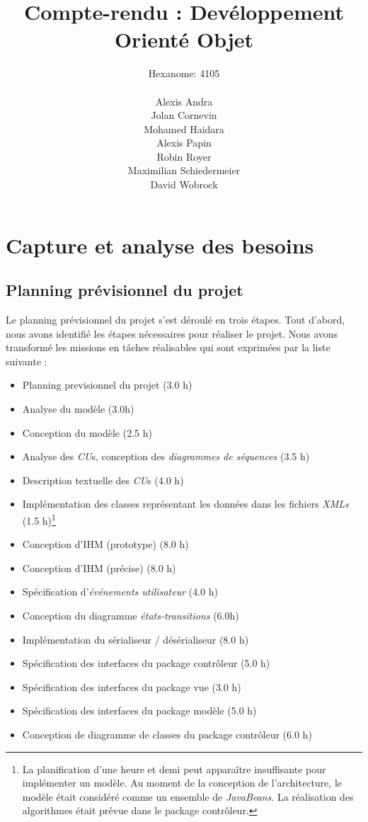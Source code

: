 \documentclass[10pt,a4paper]{book}
\author{Hexanome: 4105\\\\Alexis Andra\\Jolan Cornevin\\Mohamed Haidara\\Alexis Papin\\Robin Royer\\Maximilian Schiedermeier\\David Wobrock}
\title{Compte-rendu : Devéloppement Orienté Objet}
\begin{document}
\maketitle
\tableofcontents 
\chapter{Capture et analyse des besoins}
\section{Planning prévisionnel du projet}
Le planning prévisionnel du projet s'est déroulé en trois étapes. Tout d'abord, nous avons identifié les étapes nécessaires pour réaliser le projet. Nous avons transformé les missions en tâches réalisables qui sont exprimées par la liste suivante :
\begin{itemize}
	\item{Planning previsionnel du projet (3.0 h)}
	\item{Analyse du modèle (3.0h)}
	\item{Conception du modèle (2.5 h)}
	\item{Analyse des \textit{CU}s, conception des \textit{diagrammes de séquences} (3.5 h)}
	\item{Description textuelle des \textit{CU}s (4.0 h)}
	\item{Implémentation des classes représentant les données dans les fichiers \textit{XMLs} (1.5 h)\footnote{La planification d'une heure et demi peut apparaître insuffisante pour implémenter un modèle. Au moment de la conception de l'architecture, le modèle était considéré comme un ensemble de \textit{JavaBeans}. La réalisation des algorithmes était prévue dans le package contrôleur.}}
	\item{Conception d'IHM (prototype) (8.0 h)}
	\item{Conception d'IHM (précise) (8.0 h)}
	\item{Spécification d'\textit{événements utilisateur} (4.0 h)}
	\item{Conception du diagramme \textit{états-transitions} (6.0h)}
	\item{Implémentation du sérialiseur / désérialiseur (8.0 h)}
	\item{Spécification des interfaces du package contrôleur (5.0 h)}
	\item{Spécification des interfaces du package vue (3.0 h)}
	\item{Spécification des interfaces du package modèle (5.0 h)}
	\item{Conception de diagramme de classes du package contrôleur (6.0 h)}

\end{itemize}
\end{document}
